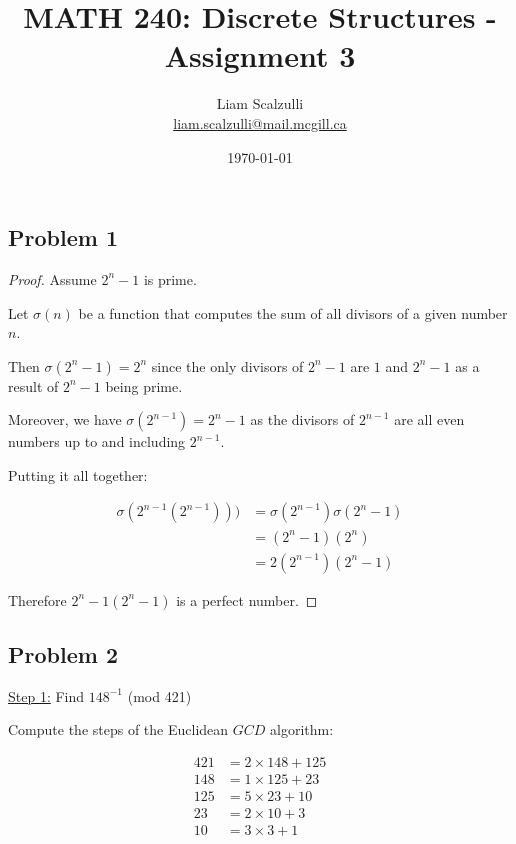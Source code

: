 \documentclass[10pt]{article}
\title{MATH 240: Discrete Structures - Assignment 3}
\author{Liam Scalzulli\\
\href{mailto:liam.scalzulli@mail.mcgill.ca}{liam.scalzulli@mail.mcgill.ca}}
\date{\today}
\begin{document}
\maketitle

\subsection*{Problem 1}

\begin{proof}
  Assume $2^n - 1$ is prime. \spacing

  \noindent
  Let $\sigma(n)$ be a function that computes the sum of all divisors of a given
  number $n$.
  \spacing

  \noindent
  Then $\sigma(2^n - 1) = 2^n$ since the only divisors of $2^n - 1$ are $1$ and $2 ^ n - 1$ as a result
  of $2^n - 1$ being prime.
  \spacing

  \noindent
  Moreover, we have $\sigma(2^{n - 1}) = 2^n - 1$ as the divisors of $2^{n - 1}$ are all even numbers up to
  and including $2^{n - 1}$.
  \spacing

  \noindent
  Putting it all together:

  \begin{align*}
    \sigma(2^{n - 1}(2^{n - 1}))) &= \sigma(2^{n - 1})\sigma(2^n - 1) \\
      &= (2^n - 1)(2^n) \\
      &= 2(2^{n - 1})(2^n - 1)
  \end{align*}

  \noindent
  Therefore $2^n-1(2^n - 1)$ is a perfect number.
\end{proof}

\newpage
\subsection*{Problem 2}

\underline{Step 1:} Find $148^{-1}$ (mod 421)
\spacing

\noindent
Compute the steps of the Euclidean $GCD$ algorithm:

\begin{align*}
  421 &= 2 \times 148 + 125 \\
  148 &= 1 \times 125 + 23 \\
  125 &= 5 \times 23 + 10 \\
  23 &= 2 \times 10 + 3 \\
  10 &= 3 \times 3 + 1
\end{align*}
\end{document}
